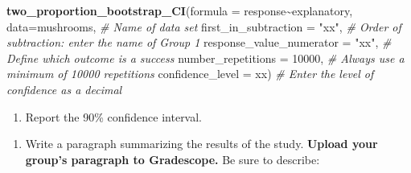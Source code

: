 \documentclass[
]{report}
\newenvironment{Shaded}{\begin{snugshade}}{\end{snugshade}}
\newcommand{\AttributeTok}[1]{\textcolor[rgb]{0.13,0.29,0.53}{#1}}
\newcommand{\CommentTok}[1]{\textcolor[rgb]{0.56,0.35,0.01}{\textit{#1}}}
\newcommand{\DecValTok}[1]{\textcolor[rgb]{0.00,0.00,0.81}{#1}}
\newcommand{\FunctionTok}[1]{\textcolor[rgb]{0.13,0.29,0.53}{\textbf{#1}}}
\newcommand{\NormalTok}[1]{#1}
\newcommand{\SpecialCharTok}[1]{\textcolor[rgb]{0.81,0.36,0.00}{\textbf{#1}}}
\newcommand{\StringTok}[1]{\textcolor[rgb]{0.31,0.60,0.02}{#1}}
\providecommand{\tightlist}{%
  \setlength{\itemsep}{0pt}\setlength{\parskip}{0pt}}
\begin{document}
\begin{Shaded}
\begin{Highlighting}[]
\FunctionTok{two\_proportion\_bootstrap\_CI}\NormalTok{(}\AttributeTok{formula =}\NormalTok{ response}\SpecialCharTok{\textasciitilde{}}\NormalTok{explanatory, }
         \AttributeTok{data=}\NormalTok{mushrooms, }\CommentTok{\# Name of data set}
         \AttributeTok{first\_in\_subtraction =} \StringTok{"xx"}\NormalTok{, }\CommentTok{\# Order of subtraction: enter the name of Group 1}
         \AttributeTok{response\_value\_numerator =} \StringTok{"xx"}\NormalTok{, }\CommentTok{\# Define which outcome is a success }
         \AttributeTok{number\_repetitions =} \DecValTok{10000}\NormalTok{, }\CommentTok{\# Always use a minimum of 10000 repetitions}
         \AttributeTok{confidence\_level =}\NormalTok{ xx) }\CommentTok{\# Enter the level of confidence as a decimal}
\end{Highlighting}
\end{Shaded}

\begin{enumerate}
\def\labelenumi{\arabic{enumi}.}
\setcounter{enumi}{9}
\tightlist
\item
  Report the 90\% confidence interval.
\end{enumerate}

\vspace{0.2in}

\begin{enumerate}
\def\labelenumi{\arabic{enumi}.}
\setcounter{enumi}{10}
\tightlist
\item
  Write a paragraph summarizing the results of the study. \textbf{Upload your group's paragraph to Gradescope.} Be sure to describe:
\end{enumerate}
\end{document}
